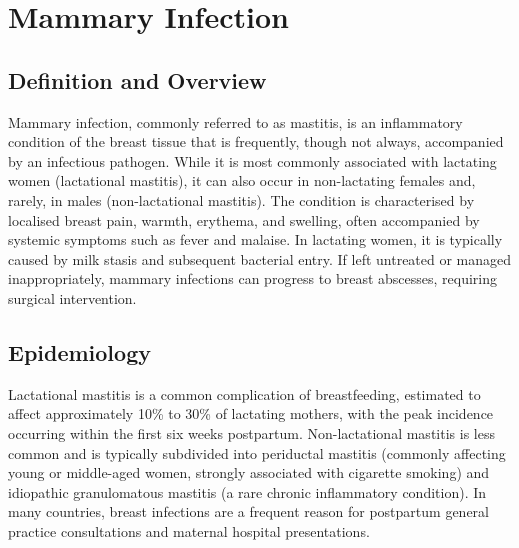 \chapter{Mammary Infection}

\section*{Definition and Overview}
Mammary infection, commonly referred to as mastitis, is an inflammatory condition of the breast tissue that is frequently, though not always, accompanied by an infectious pathogen. While it is most commonly associated with lactating women (lactational mastitis), it can also occur in non-lactating females and, rarely, in males (non-lactational mastitis). The condition is characterised by localised breast pain, warmth, erythema, and swelling, often accompanied by systemic symptoms such as fever and malaise. In lactating women, it is typically caused by milk stasis and subsequent bacterial entry. If left untreated or managed inappropriately, mammary infections can progress to breast abscesses, requiring surgical intervention.

\section*{Epidemiology}
Lactational mastitis is a common complication of breastfeeding, estimated to affect approximately 10\% to 30\% of lactating mothers, with the peak incidence occurring within the first six weeks postpartum. Non-lactational mastitis is less common and is typically subdivided into periductal mastitis (commonly affecting young or middle-aged women, strongly associated with cigarette smoking) and idiopathic granulomatous mastitis (a rare chronic inflammatory condition). In many countries, breast infections are a frequent reason for postpartum general practice consultations and maternal hospital presentations.

